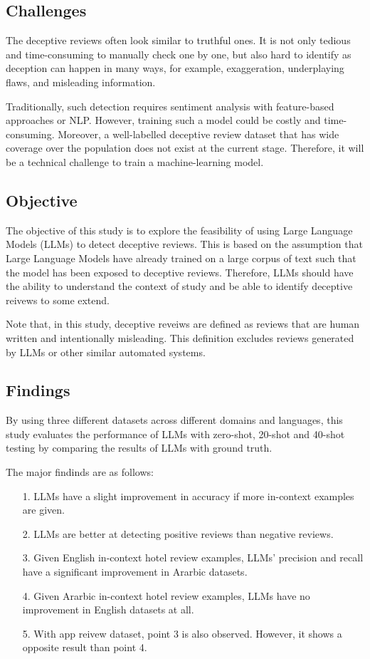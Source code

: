 \documentclass[sigconf, nonacm]{acmart}
\theoremstyle{definition}
\begin{document}
\subsection{Challenges}
The deceptive reviews often look similar to truthful ones. It is not only tedious and time-consuming to manually check one by one, but also hard to identify as deception can happen in many ways, for example, exaggeration, underplaying flaws, and misleading information.

Traditionally, such detection requires sentiment analysis with feature-based approaches or NLP. However, training such a model could be costly and time-consuming. Moreover, a well-labelled deceptive review dataset that has wide coverage over the population does not exist at the current stage. Therefore, it will be a technical challenge to train a machine-learning model.

\subsection{Objective}
The objective of this study is to explore the feasibility of using Large Language Models (LLMs) to detect deceptive reviews. This is based on the assumption that Large Language Models have already trained on a large corpus of text such that the model has been exposed to deceptive reviews. Therefore, LLMs should have the ability to understand the context of study and be able to identify deceptive reivews to some extend.

Note that, in this study, deceptive reveiws are defined as reviews that are human written and intentionally misleading. This definition excludes reviews generated by LLMs or other similar automated systems.

\subsection{Findings}
By using three different datasets across different domains and languages, this study evaluates the performance of LLMs with zero-shot, 20-shot and 40-shot testing by comparing the results of LLMs with ground truth.

\noindent The major findinds are as follows:
\begin{itemize}
  \item[1.] LLMs have a slight improvement in accuracy if more in-context examples are given.
  \item[2.] LLMs are better at detecting positive reviews than negative reviews.
  \item[3.] Given English in-context hotel review examples, LLMs' precision and recall have a significant improvement in Ararbic datasets.
  \item[4.] Given Ararbic in-context hotel review examples, LLMs have no improvement in English datasets at all.
  \item[5.] With app reivew dataset, point 3 is also observed. However, it shows a opposite result than point 4.
\end{itemize}
\end{document}
